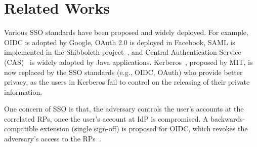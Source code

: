 \section{Related Works}%
\label{sec:related}
Various SSO  standards have been proposed and widely deployed. For example, OIDC is adopted by Google, OAuth 2.0 is deployed in Facebook, SAML is implemented in the Shibboleth project~\cite{Shibboleth}, and Central Authentication Service (CAS)~\cite{aubry2004esup} is widely adopted by Java applications. 
Kerberos~\cite{Kerberos}, proposed by MIT, is now replaced by the SSO standards (e.g., OIDC, OAuth) who provide better privacy, as the users in Kerberos fail to control on the releasing of their private information.

One concern of SSO is that, the adversary  controls the user's accounts at the correlated RPs, once the user's account at IdP is compromised. A backwards-compatible extension (single sign-off) is proposed for OIDC, which revokes the adversary's access to the RPs~\cite{GhasemisharifRC18}.

